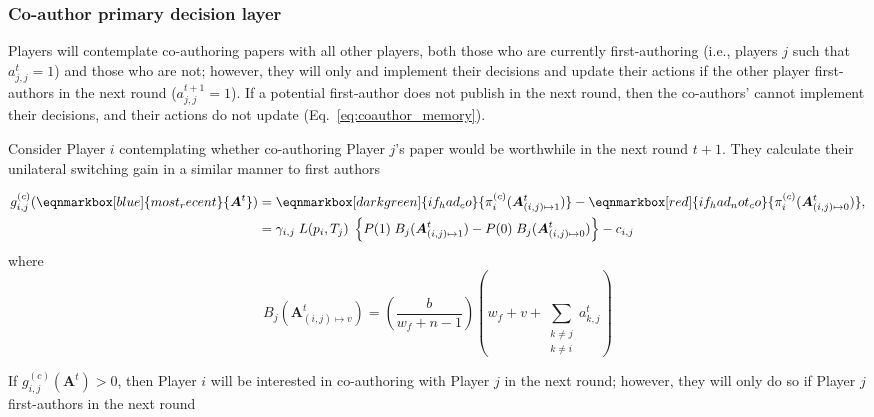 \documentclass[12pt]{article}
\begin{document}
\subsubsection{Co-author primary decision layer}

Players will contemplate co-authoring papers with all other players,
both those who are currently first-authoring
(i.e., players $j$ such that $a_{j,j}^t = 1$) 
and those who are not;
however, they will only and implement their decisions and update their actions
if the other player first-authors in the next round ($a_{j,j}^{t+1} = 1$). 
If a potential first-author does not publish in the next round, 
then the co-authors' cannot implement their decisions,
and their actions do not update (Eq.~\ref{eq:coauthor_memory}).

Consider Player $i$ contemplating whether co-authoring Player $j$'s paper would be worthwhile in the next round $t+1$. 
They calculate their unilateral switching gain in a similar manner
to first authors

\vspace{1em}
\begin{align}
    g_{i, j}^{(c)}(\eqnmarkbox[blue]{most_recent}{\boldsymbol{A}^t})
    & = \eqnmarkbox[darkgreen]{if_had_co}{\pi_i^{(c)}(
            \boldsymbol{A}_{(i, j) \mapsto 1}^t
        )}
        - \eqnmarkbox[red]{if_had_not_co}{\pi_i^{(c)}(
            \boldsymbol{A}_{(i, j) \mapsto 0}^t
        )}, \nonumber \\
    & = \gamma_{i, j} \; L(p_i, T_j) \;
    \left\{
        P(1) \; B_j(
            \boldsymbol{A}_{(i, j) \mapsto 1}^t
        )
        - P(0) \; B_j(
            \boldsymbol{A}_{(i, j) \mapsto 0}^t
        )
    \right\}
    - c_{i, j}
\end{align}
where
\begin{equation*}
        B_j(\boldsymbol{A}_{(i, j) \mapsto v}^t)
        = \left( \frac{ b }{ w_f + n - 1 } \right)  
        \left( w_f + v + \sum_{\substack{k \neq j \\ k \neq i}} a_{k, j}^t \right)
\end{equation*}

If $g_{i, j}^{(c)}(\boldsymbol{A}^{t}) > 0$, 
then Player $i$ will be interested in co-authoring with Player $j$ in the next round;
however,
they will only do so if Player $j$ first-authors in the next round
\end{document}
